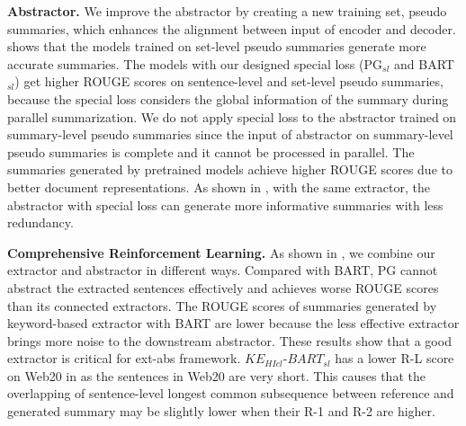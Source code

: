 \textbf{Abstractor.}
We improve the abstractor by creating a new training set, pseudo summaries, 
which enhances the alignment between input of encoder and decoder.
 shows that
the models trained on set-level pseudo summaries
generate more accurate summaries.
The models with our designed special loss (PG$_{sl}$ and BART$_{sl}$) get higher ROUGE scores
on sentence-level and set-level pseudo summaries,
because the special loss considers the global information of the summary during parallel summarization.
We do not apply special loss to the abstractor trained on summary-level pseudo summaries 
since the input of abstractor on summary-level pseudo summaries is complete and it cannot be processed in parallel.
The summaries generated by pretrained models achieve higher ROUGE scores
due to better document representations.
As shown in , with the same extractor, the abstractor with special loss
can generate more informative summaries with less redundancy.


\textbf{Comprehensive Reinforcement Learning.}
As shown in , we combine our extractor
and abstractor in different ways.
Compared with BART,
PG cannot abstract the extracted sentences effectively
and achieves worse ROUGE scores than its connected extractors.
The ROUGE scores of summaries generated by keyword-based extractor with BART are lower 
because the less effective extractor brings more noise to the downstream abstractor.
These results show that a good extractor is critical for ext-abs framework.
$KE_{HIcl}$-$BART_{sl}$ has a lower R-L score on Web20
in 
as the sentences in Web20 are very short.
This causes that the overlapping of sentence-level longest common subsequence
between reference and generated summary may be slightly lower when their R-1 and R-2 are higher.

